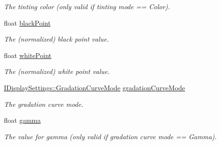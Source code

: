 \begin{DoxyCompactItemize}
\begin{DoxyCompactList}\small\item\em The tinting color (only valid if tinting mode == Color). \end{DoxyCompactList}\item 
\mbox{\label{structlib_c_z_i_1_1_channel_display_settings_p_o_d_a5375f2af9da2d27d7c5899380ed7323a}} 
float \hyperlink{structlib_c_z_i_1_1_channel_display_settings_p_o_d_a5375f2af9da2d27d7c5899380ed7323a}{black\+Point}
\begin{DoxyCompactList}\small\item\em The (normalized) black point value. \end{DoxyCompactList}\item 
\mbox{\label{structlib_c_z_i_1_1_channel_display_settings_p_o_d_a5df9aec48677b4a96e305b9010f741cb}} 
float \hyperlink{structlib_c_z_i_1_1_channel_display_settings_p_o_d_a5df9aec48677b4a96e305b9010f741cb}{white\+Point}
\begin{DoxyCompactList}\small\item\em The (normalized) white point value. \end{DoxyCompactList}\item 
\mbox{\label{structlib_c_z_i_1_1_channel_display_settings_p_o_d_a3f54ad6d72307e0e15f1e2f89bfd6aea}} 
\hyperlink{classlib_c_z_i_1_1_i_display_settings_af114dfcc8a603ca1c2fc57bc35c97684}{I\+Display\+Settings\+::\+Gradation\+Curve\+Mode} \hyperlink{structlib_c_z_i_1_1_channel_display_settings_p_o_d_a3f54ad6d72307e0e15f1e2f89bfd6aea}{gradation\+Curve\+Mode}
\begin{DoxyCompactList}\small\item\em The gradation curve mode. \end{DoxyCompactList}\item 
\mbox{\label{structlib_c_z_i_1_1_channel_display_settings_p_o_d_a845e01c1c5e41e2ab64fe6a22361d8d6}} 
float \hyperlink{structlib_c_z_i_1_1_channel_display_settings_p_o_d_a845e01c1c5e41e2ab64fe6a22361d8d6}{gamma}
\begin{DoxyCompactList}\small\item\em The value for gamma (only valid if gradation curve mode == Gamma). \end{DoxyCompactList}\item 

\end{DoxyCompactItemize}
